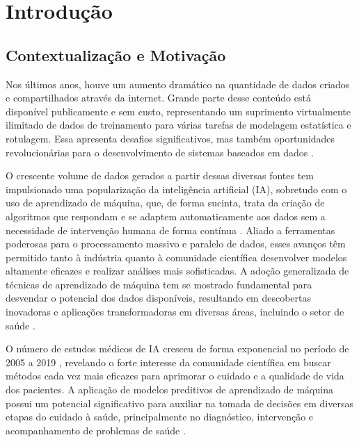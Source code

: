 
\chapter[Introdução]{Introdução}
\label{Introdução}

\section{Contextualização e Motivação}\label{sec-context}

Nos últimos anos, houve um aumento dramático na quantidade de dados criados e compartilhados através da internet. Grande parte desse conteúdo está disponível publicamente e sem custo, representando um suprimento virtualmente ilimitado de dados de treinamento para várias tarefas de modelagem estatística e rotulagem. Essa  apresenta desafios significativos, mas também oportunidades revolucionárias para o desenvolvimento de sistemas baseados em dados \cite{SeltzerZ09}.

O crescente volume de dados gerados a partir dessas diversas fontes tem impulsionado uma popularização da inteligência artificial (IA), sobretudo com o uso de aprendizado de máquina, que, de forma sucinta, trata da criação de algoritmos que respondam e se adaptem automaticamente aos dados sem a necessidade de intervenção humana de forma contínua \cite{chiavegatto2015}. Aliado a ferramentas poderosas para o processamento massivo e paralelo de dados, esses avanços têm permitido tanto à indústria quanto à comunidade científica desenvolver modelos altamente eficazes e realizar análises mais sofisticadas. A adoção generalizada de técnicas de aprendizado de máquina tem se mostrado fundamental para desvendar o potencial dos dados disponíveis, resultando em descobertas inovadoras e aplicações transformadoras em diversas áreas, incluindo o setor de saúde \cite{mlaplicadosaude}.

O número de estudos médicos de IA cresceu de forma exponencial no período de 2005 a 2019 \cite{ShortGuide2020}, revelando o forte interesse da comunidade científica em buscar métodos cada vez mais eficazes para aprimorar o cuidado e a qualidade de vida dos pacientes. A aplicação de modelos preditivos de aprendizado de máquina possui um potencial significativo para auxiliar na tomada de decisões em diversas etapas do cuidado à saúde, principalmente no diagnóstico, intervenção e acompanhamento de problemas de saúde \cite{obermeyer2017}.

